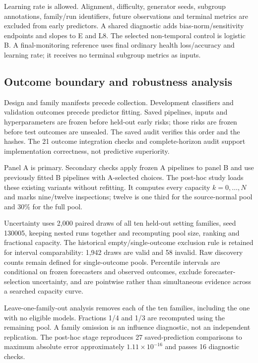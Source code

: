 Learning rate is allowed. Alignment, difficulty, generator seeds, subgroup annotations, family/run identifiers, future observations and terminal metrics are excluded from early predictors. A shared diagnostic adds bias-norm/sensitivity endpoints and slopes to E and L8. The selected non-temporal control is logistic B. A final-monitoring reference uses final ordinary health loss/accuracy and learning rate; it receives no terminal subgroup metrics as inputs.

\subsection{Outcome boundary and robustness analysis}
Design and family manifests precede collection. Development classifiers and validation outcomes precede predictor fitting. Saved pipelines, inputs and hyperparameters are frozen before held-out early risks; those risks are frozen before test outcomes are unsealed. The saved audit verifies this order and the hashes. The 21 outcome integration checks and complete-horizon audit support implementation correctness, not predictive superiority.

Panel A is primary. Secondary checks apply frozen A pipelines to panel B and use previously fitted B pipelines with A-selected choices. The post-hoc study loads these existing variants without refitting. It computes every capacity $k=0,\ldots,N$ and marks nine/twelve inspections; twelve is one third for the source-normal pool and 30\% for the full pool.

Uncertainty uses 2,000 paired draws of all ten held-out setting families, seed 130005, keeping nested runs together and recomputing pool size, ranking and fractional capacity. The historical empty/single-outcome exclusion rule is retained for interval comparability: 1,942 draws are valid and 58 invalid. Raw discovery counts remain defined for single-outcome pools. Percentile intervals are conditional on frozen forecasters and observed outcomes, exclude forecaster-selection uncertainty, and are pointwise rather than simultaneous evidence across a searched capacity curve.

Leave-one-family-out analysis removes each of the ten families, including the one with no eligible models. Fractions 1/4 and 1/3 are recomputed using the remaining pool. A family omission is an influence diagnostic, not an independent replication. The post-hoc stage reproduces 27 saved-prediction comparisons to maximum absolute error approximately $1.11\times10^{-16}$ and passes 16 diagnostic checks.

